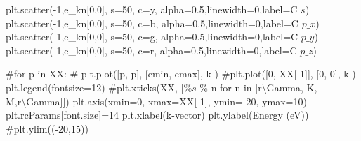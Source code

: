 \documentclass[
  letterpaper,
  DIV=11,
  numbers=noendperiod]{scrreprt}
\newenvironment{Shaded}{\begin{snugshade}}{\end{snugshade}}
\newcommand{\CommentTok}[1]{\textcolor[rgb]{0.37,0.37,0.37}{#1}}
\newcommand{\DecValTok}[1]{\textcolor[rgb]{0.68,0.00,0.00}{#1}}
\newcommand{\FloatTok}[1]{\textcolor[rgb]{0.68,0.00,0.00}{#1}}
\newcommand{\NormalTok}[1]{\textcolor[rgb]{0.00,0.23,0.31}{#1}}
\newcommand{\OperatorTok}[1]{\textcolor[rgb]{0.37,0.37,0.37}{#1}}
\newcommand{\StringTok}[1]{\textcolor[rgb]{0.13,0.47,0.30}{#1}}
\begin{document}
\begin{Shaded}
\begin{Highlighting}[]
\NormalTok{plt.scatter(}\OperatorTok{{-}}\DecValTok{1}\NormalTok{,e\_kn[}\DecValTok{0}\NormalTok{,}\DecValTok{0}\NormalTok{], s}\OperatorTok{=}\DecValTok{50}\NormalTok{, c}\OperatorTok{=}\StringTok{\textquotesingle{}y\textquotesingle{}}\NormalTok{, alpha}\OperatorTok{=}\FloatTok{0.5}\NormalTok{,linewidth}\OperatorTok{=}\DecValTok{0}\NormalTok{,label}\OperatorTok{=}\StringTok{\textquotesingle{}C $s$\textquotesingle{}}\NormalTok{)}
\NormalTok{plt.scatter(}\OperatorTok{{-}}\DecValTok{1}\NormalTok{,e\_kn[}\DecValTok{0}\NormalTok{,}\DecValTok{0}\NormalTok{], s}\OperatorTok{=}\DecValTok{50}\NormalTok{, c}\OperatorTok{=}\StringTok{\textquotesingle{}b\textquotesingle{}}\NormalTok{, alpha}\OperatorTok{=}\FloatTok{0.5}\NormalTok{,linewidth}\OperatorTok{=}\DecValTok{0}\NormalTok{,label}\OperatorTok{=}\StringTok{\textquotesingle{}C $p\_x$\textquotesingle{}}\NormalTok{)}
\NormalTok{plt.scatter(}\OperatorTok{{-}}\DecValTok{1}\NormalTok{,e\_kn[}\DecValTok{0}\NormalTok{,}\DecValTok{0}\NormalTok{], s}\OperatorTok{=}\DecValTok{50}\NormalTok{, c}\OperatorTok{=}\StringTok{\textquotesingle{}g\textquotesingle{}}\NormalTok{, alpha}\OperatorTok{=}\FloatTok{0.5}\NormalTok{,linewidth}\OperatorTok{=}\DecValTok{0}\NormalTok{,label}\OperatorTok{=}\StringTok{\textquotesingle{}C $p\_y$\textquotesingle{}}\NormalTok{)}
\NormalTok{plt.scatter(}\OperatorTok{{-}}\DecValTok{1}\NormalTok{,e\_kn[}\DecValTok{0}\NormalTok{,}\DecValTok{0}\NormalTok{], s}\OperatorTok{=}\DecValTok{50}\NormalTok{, c}\OperatorTok{=}\StringTok{\textquotesingle{}r\textquotesingle{}}\NormalTok{, alpha}\OperatorTok{=}\FloatTok{0.5}\NormalTok{,linewidth}\OperatorTok{=}\DecValTok{0}\NormalTok{,label}\OperatorTok{=}\StringTok{\textquotesingle{}C $p\_z$\textquotesingle{}}\NormalTok{)}

\CommentTok{\#for p in XX:}
\CommentTok{\#    plt.plot([p, p], [emin, emax], \textquotesingle{}k{-}\textquotesingle{})}
\CommentTok{\#plt.plot([0, XX[{-}1]], [0, 0], \textquotesingle{}k{-}\textquotesingle{})}
\NormalTok{plt.legend(fontsize}\OperatorTok{=}\DecValTok{12}\NormalTok{)}
\CommentTok{\#plt.xticks(XX, [\textquotesingle{}$\%s$\textquotesingle{} \% n for n in [r\textquotesingle{}\textbackslash{}Gamma\textquotesingle{}, \textquotesingle{}K\textquotesingle{}, \textquotesingle{}M\textquotesingle{},r\textquotesingle{}\textbackslash{}Gamma\textquotesingle{}]])}
\NormalTok{plt.axis(xmin}\OperatorTok{=}\DecValTok{0}\NormalTok{, xmax}\OperatorTok{=}\NormalTok{XX[}\OperatorTok{{-}}\DecValTok{1}\NormalTok{], ymin}\OperatorTok{={-}}\DecValTok{20}\NormalTok{, ymax}\OperatorTok{=}\DecValTok{10}\NormalTok{)}
\NormalTok{plt.rcParams[}\StringTok{\textquotesingle{}font.size\textquotesingle{}}\NormalTok{]}\OperatorTok{=}\DecValTok{14}
\NormalTok{plt.xlabel(}\StringTok{\textquotesingle{}k{-}vector\textquotesingle{}}\NormalTok{)}
\NormalTok{plt.ylabel(}\StringTok{\textquotesingle{}Energy (eV)\textquotesingle{}}\NormalTok{)}
\CommentTok{\#plt.ylim(({-}20,15))}
\end{Highlighting}
\end{Shaded}
\end{document}
